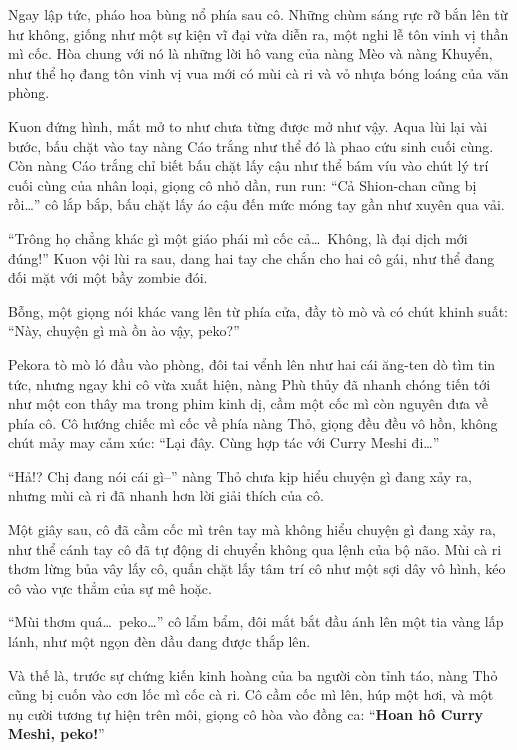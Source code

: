 \documentclass[../main.tex]{subfiles}
\begin{document}
Ngay lập tức, pháo hoa bùng nổ phía sau cô. Những chùm sáng rực rỡ bắn lên từ hư không, giống như một sự kiện vĩ đại vừa diễn ra, một nghi lễ tôn vinh vị thần mì cốc. Hòa chung với nó là những lời hô vang của nàng Mèo và nàng Khuyển, như thể họ đang tôn vinh vị vua mới có mùi cà ri và vỏ nhựa bóng loáng của văn phòng.


Kuon đứng hình, mắt mở to như chưa từng được mở như vậy. Aqua lùi lại vài bước, bấu chặt vào tay nàng Cáo trắng như thể đó là phao cứu sinh cuối cùng. Còn nàng Cáo trắng chỉ biết bấu chặt lấy cậu như thể bám víu vào chút lý trí cuối cùng của nhân loại, giọng cô nhỏ dần, run run: ``Cả Shion-chan cũng bị rồi\dots'' cô lắp bắp, bấu chặt lấy áo cậu đến mức móng tay gần như xuyên qua vải.

``Trông họ chẳng khác gì một giáo phái mì cốc cả\dots\ Không, là đại dịch mới đúng!'' Kuon vội lùi ra sau, dang hai tay che chắn cho hai cô gái, như thể đang đối mặt với một bầy zombie đói.

Bỗng, một giọng nói khác vang lên từ phía cửa, đầy tò mò và có chút khinh suất: ``Này, chuyện gì mà ồn ào vậy, peko?''

Pekora tò mò ló đầu vào phòng, đôi tai vểnh lên như hai cái ăng-ten dò tìm tin tức, nhưng ngay khi cô vừa xuất hiện, nàng Phù thủy đã nhanh chóng tiến tới như một con thây ma trong phim kinh dị, cầm một cốc mì còn nguyên đưa về phía cô. Cô hướng chiếc mì cốc về phía nàng Thỏ, giọng đều đều vô hồn, không chút mảy may cảm xúc: ``Lại đây. Cùng hợp tác với Curry Meshi đi\dots''

``Hả!? Chị đang nói cái gì--'' nàng Thỏ chưa kịp hiểu chuyện gì đang xảy ra, nhưng mùi cà ri đã nhanh hơn lời giải thích của cô.

Một giây sau, cô đã cầm cốc mì trên tay mà không hiểu chuyện gì đang xảy ra, như thể cánh tay cô đã tự động di chuyển không qua lệnh của bộ não. Mùi cà ri thơm lừng bủa vây lấy cô, quấn chặt lấy tâm trí cô như một sợi dây vô hình, kéo cô vào vực thẳm của sự mê hoặc.

``Mùi thơm quá\dots\ peko\dots'' cô lẩm bẩm, đôi mắt bắt đầu ánh lên một tia vàng lấp lánh, như một ngọn đèn dầu đang được thắp lên.


Và thế là, trước sự chứng kiến kinh hoàng của ba người còn tỉnh táo, nàng Thỏ cũng bị cuốn vào cơn lốc mì cốc cà ri. Cô cầm cốc mì lên, húp một hơi, và một nụ cười tương tự hiện trên môi, giọng cô hòa vào đồng ca: ``\textbf{Hoan hô Curry Meshi, peko!}''
\end{document}
